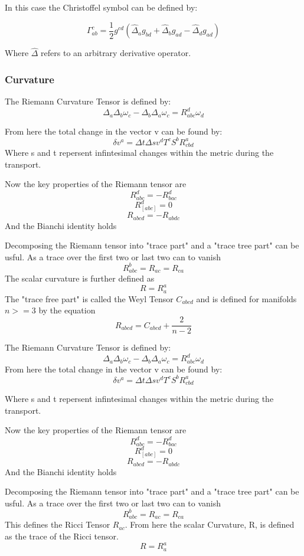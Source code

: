   In this case the Christoffel symbol can be defined by:

\[
  \Gamma^c_{ab} = \frac 12 g^{cd}\left(\hat{\Delta}_a g_{bd}+ \hat{\Delta}_b g_{ad} - \hat{\Delta}_d g_{ad} \right)
  \]

  Where $\hat{\Delta}$ refers to an arbitrary derivative operator.

\subsubsection{Curvature}

The Riemann Curvature Tensor is defined by:
\[
\Delta_a \Delta_b \omega_c - \Delta_b \Delta_a \omega_c = R_{abc}^d \omega_d
  \]

  From here the total change in the vector v can be found by:
\[
\delta v^a = \Delta t \Delta s v^d T^c S^b R_{cbd}^a
  \]
  Where s and t repersent infintesimal changes within the metric during the transport.

  Now the key properties of the Riemann tensor are
\[
R_{abc}^d = - R_{bac}^d
\]
\[
R_{[abc]}^d = 0
\]
\[
R_{abcd}=-R_{abdc}
\]
And the Bianchi identity holds

Decomposing the Riemann tensor into "trace part" and a "trace tree part" can be usful. As a trace over the first two or last two can to vanish
\[
R_{abc}^b=R_{ac}=R_{ca}
\]
The scalar curvature is further defined as
\[
R=R_a^a
\]
The "trace free part" is called the Weyl Tensor $C_{abcd}$ and is defined for manifolds $n >= 3$ by the equation
\[
R_{abcd}= C_{abcd} + \frac{2}{n-2}
\]

The Riemann Curvature Tensor is defined by:
\[
  \Delta_a \Delta_b \omega_c - \Delta_b \Delta_a \omega_c = R_{abc}^d \omega_d
\]
From here the total change in the vector v can be found by:
\[
\delta v^a = \Delta t \Delta s v^d T^c S^b R_{cbd}^a
  \]

Where s and t repersent infintesimal changes within the metric during the transport.

Now the key properties of the Riemann tensor are
\[
R_{abc}^d = - R_{bac}^d
\]
\[
R_{[abc]}^d = 0
\]
\[
R_{abcd}=-R_{abdc}
\]
And the Bianchi identity holds

Decomposing the Riemann tensor into "trace part" and a "trace tree part" can be usful. As a trace over the first two or last two can to vanish
\[
R_{abc}^b=R_{ac}=R_{ca}
  \]
  This defines the Ricci Tensor $R_{ac}$. From here the scalar Curvature, R, is defined as the trace of the Ricci tensor.
\[
R=R_a^a
\]

